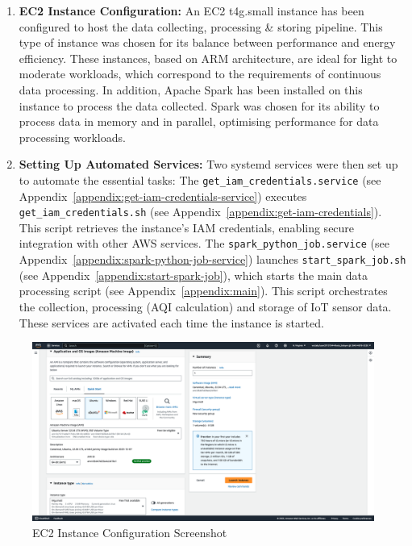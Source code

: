 \documentclass[12pt,oneside]{book} %
\begin{document}
\begin{enumerate}
    \item \textbf{EC2 Instance Configuration:} An EC2 t4g.small instance has been configured to host the data collecting, processing \& storing pipeline. This type of instance was chosen for its balance between performance and energy efficiency. These instances, based on ARM architecture, are ideal for light to moderate workloads, which correspond to the requirements of continuous data processing. In addition, Apache Spark has been installed on this instance to process the data collected. Spark was chosen for its ability to process data in memory and in parallel, optimising performance for data processing workloads.
    \item \textbf{Setting Up Automated Services:} Two systemd services were then set up to automate the essential tasks: The \texttt{get\_iam\_credentials.service} (see Appendix~\ref{appendix:get-iam-credentials-service}) executes \texttt{get\_iam\_credentials.sh} (see Appendix~\ref{appendix:get-iam-credentials}). This script retrieves the instance's IAM credentials, enabling secure integration with other AWS services. The \texttt{spark\_python\_job.service} (see Appendix~\ref{appendix:spark-python-job-service}) launches \texttt{start\_spark\_job.sh} (see Appendix~\ref{appendix:start-spark-job}), which starts the main data processing script (see Appendix~\ref{appendix:main}). This script orchestrates the collection, processing (AQI calculation) and storage of IoT sensor data. These services are activated each time the instance is started.
\end{enumerate}

\begin{figure}[H]
    \centering
    \includegraphics[width=1\linewidth]{images/t4g-small.png}
    \caption{EC2 Instance Configuration Screenshot}\label{fig:ec2-instance-configuration}
\end{figure}
\end{document}

